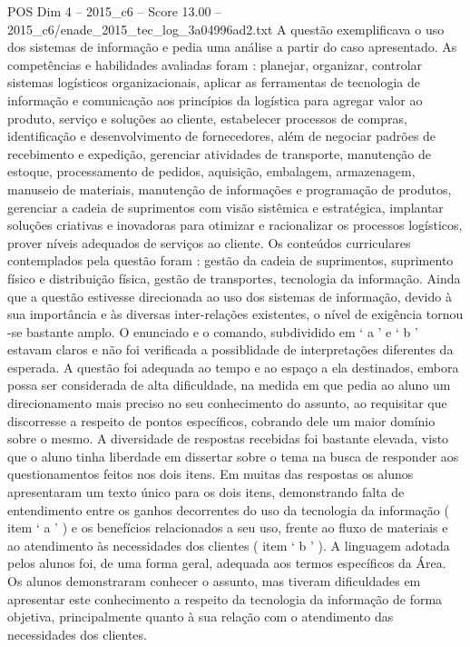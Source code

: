 \begin{textsample}{POS Dim 4 – 2015\_c6 – Score 13.00 – 2015\_c6/enade\_2015\_tec\_log\_3a04996ad2.txt}
A questão exemplificava o uso dos sistemas de informação e pedia uma análise a partir do caso apresentado.
As competências e habilidades avaliadas foram : planejar, organizar, controlar sistemas logísticos organizacionais, aplicar as ferramentas de tecnologia de informação e comunicação aos princípios da logística para agregar valor ao produto, serviço e soluções ao cliente, estabelecer processos de compras, identificação e desenvolvimento de fornecedores, além de negociar padrões de recebimento e expedição, gerenciar atividades de transporte, manutenção de estoque, processamento de pedidos, aquisição, embalagem, armazenagem, manuseio de materiais, manutenção de informações e programação de produtos, gerenciar a cadeia de suprimentos com visão sistêmica e estratégica, implantar soluções criativas e inovadoras para otimizar e racionalizar os processos logísticos, prover níveis adequados de serviços ao cliente.
Os conteúdos curriculares contemplados pela questão foram : gestão da cadeia de suprimentos, suprimento físico e distribuição física, gestão de transportes, tecnologia da informação.
Ainda que a questão estivesse direcionada ao uso dos sistemas de informação, devido à sua importância e às diversas inter-relações existentes, o nível de exigência tornou -se bastante amplo.
O enunciado e o comando, subdividido em ‘ a ’ e ‘ b ’ estavam claros e não foi verificada a possiblidade de interpretações diferentes da esperada.
A questão foi adequada ao tempo e ao espaço a ela destinados, embora possa ser considerada de alta dificuldade, na medida em que pedia ao aluno um direcionamento mais preciso no seu conhecimento do assunto, ao requisitar que discorresse a respeito de pontos específicos, cobrando dele um maior domínio sobre o mesmo.
A diversidade de respostas recebidas foi bastante elevada, visto que o aluno tinha liberdade em dissertar sobre o tema na busca de responder aos questionamentos feitos nos dois itens.
Em muitas das respostas os alunos apresentaram um texto único para os dois itens, demonstrando falta de entendimento entre os ganhos decorrentes do uso da tecnologia da informação ( item ‘ a ’ ) e os benefícios relacionados a seu uso, frente ao fluxo de materiais e ao atendimento às necessidades dos clientes ( item ‘ b ’ ).
A linguagem adotada pelos alunos foi, de uma forma geral, adequada aos termos específicos da Área.
Os alunos demonstraram conhecer o assunto, mas tiveram dificuldades em apresentar este conhecimento a respeito da tecnologia da informação de forma objetiva, principalmente quanto à sua relação com o atendimento das necessidades dos clientes.

\end{textsample}
